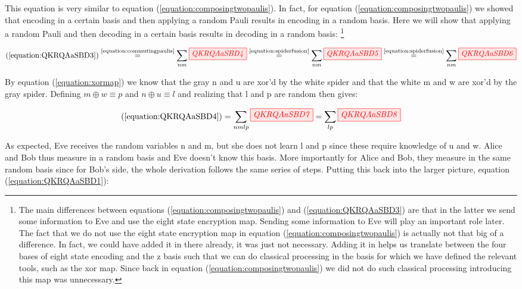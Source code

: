 \documentclass[]{article}
\newcommand{\equaltext}[1]{\ensuremath{\stackrel{\text{#1}}{=}}}
\begin{document}
This equation is very similar to equation (\ref{equation:composingtwopaulis}). In fact, for equation (\ref{equation:composingtwopaulis}) we showed that encoding in a certain basis and then applying a random Pauli results in encoding in a random basis. Here we will show that applying a random Pauli and then decoding in a certain basis results in decoding in a random basis: \footnote{The main differences between equations (\ref{equation:composingtwopaulis}) and (\ref{equation:QKRQAaSBD3}) are that in the latter we send some information to Eve and use the eight state encryption map. Sending some information to Eve will play an important role later. The fact that we do not use the eight state encryption map in equation (\ref{equation:composingtwopaulis}) is actually not that big of a difference. In fact, we could have added it in there already, it was just not necessary. Adding it in helps us translate between the four bases of eight state encoding and the z basis such that we can do classical processing in the basis for which we have defined the relevant tools, such as the xor map. Since back in equation (\ref{equation:composingtwopaulis}) we did not do such classical processing introducing this map was unnecessary.} 

\begin{equation}
\label{equation:QKRQAaSBD4}
(\ref{equation:QKRQAaSBD3}) \equaltext{\ref{equation:commutingpaulis}} \sum\limits_{nm}\tikzfig{QKRQAaSBD4} \equaltext{\ref{equation:spiderfusion}} \sum\limits_{nm}\tikzfig{QKRQAaSBD5} \equaltext{\ref{equation:spiderfusion}} \sum\limits_{nm}\tikzfig{QKRQAaSBD6} 
\end{equation}

By equation (\ref{equation:xormap}) we know that the gray n and u are xor'd by the white spider and that the white m and w are xor'd by the gray spider. Defining $m \oplus w \equiv p$ and $n \oplus u \equiv l$ and realizing that l and p are random then gives: 

\begin{equation}
	\label{equation:randompaulidecoding}
	(\ref{equation:QKRQAaSBD4}) = 
	\sum\limits_{nmlp}\tikzfig{QKRQAaSBD7} = \sum\limits_{lp}\tikzfig{QKRQAaSBD8}
\end{equation}

As expected, Eve receives the random variables n and m, but she does not learn l and p since these require knowledge of u and w. Alice and Bob thus measure in a random basis and Eve doesn't know this basis. More importantly for Alice and Bob, they measure in the same random basis since for Bob's side, the whole derivation follows the same series of steps. Putting this back into the larger picture, equation (\ref{equation:QKRQAaSBD1}):
\end{document}
